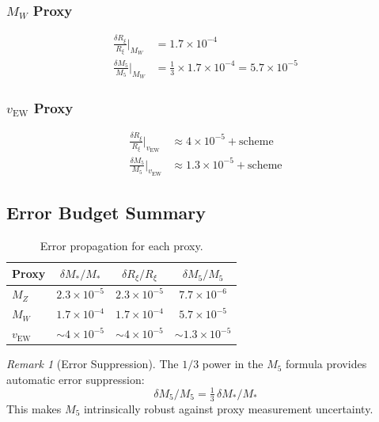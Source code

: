 \documentclass[11pt,a4paper]{article}
\newcommand{\Mfive}{M_5}
\newcommand{\Rxi}{R_\xi}
\newcommand{\MZ}{M_Z}
\newcommand{\MW}{M_W}
\newcommand{\vEW}{v_{\mathrm{EW}}}
\newcommand{\Mstar}{M_*}
\theoremstyle{definition}
\theoremstyle{plain}
\theoremstyle{remark}
\newtheorem{remark}{Remark}[section]
\begin{document}
\subsubsection{$\MW$ Proxy}
\begin{align}
\frac{\delta\Rxi}{\Rxi}\bigg|_{\MW} &= 1.7 \times 10^{-4} \label{eq:error-Rxi-MW} \\
\frac{\delta\Mfive}{\Mfive}\bigg|_{\MW} &= \frac{1}{3} \times 1.7 \times 10^{-4} = 5.7 \times 10^{-5} \label{eq:error-M5-MW}
\end{align}

\subsubsection{$\vEW$ Proxy}
\begin{align}
\frac{\delta\Rxi}{\Rxi}\bigg|_{\vEW} &\approx 4 \times 10^{-5} + \text{scheme} \label{eq:error-Rxi-vEW} \\
\frac{\delta\Mfive}{\Mfive}\bigg|_{\vEW} &\approx 1.3 \times 10^{-5} + \text{scheme} \label{eq:error-M5-vEW}
\end{align}

\subsection{Error Budget Summary}

\begin{table}[htbp]
\centering
\caption{Error propagation for each proxy.}
\label{tab:error-budget}
\begin{tabular}{@{}lccc@{}}
\toprule
Proxy & $\delta\Mstar/\Mstar$ & $\delta\Rxi/\Rxi$ & $\delta\Mfive/\Mfive$ \\
\midrule
$\MZ$ & $2.3 \times 10^{-5}$ & $2.3 \times 10^{-5}$ & $7.7 \times 10^{-6}$ \\
$\MW$ & $1.7 \times 10^{-4}$ & $1.7 \times 10^{-4}$ & $5.7 \times 10^{-5}$ \\
$\vEW$ & $\sim 4 \times 10^{-5}$ & $\sim 4 \times 10^{-5}$ & $\sim 1.3 \times 10^{-5}$ \\
\bottomrule
\end{tabular}
\end{table}

\begin{remark}[Error Suppression]
The $1/3$ power in the $\Mfive$ formula provides automatic error suppression:
\begin{equation}
\boxed{\delta\Mfive/\Mfive = \tfrac{1}{3}\,\delta\Mstar/\Mstar}
\label{eq:error-suppression-box}
\end{equation}
This makes $\Mfive$ intrinsically robust against proxy measurement uncertainty.
\end{remark}
\end{document}
